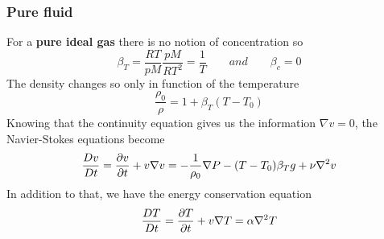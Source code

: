 		\subsubsection{Pure fluid}
			For a \textbf{pure ideal gas} there is no notion of concentration so 
			\begin{equation}
				\beta _T = \frac{RT}{pM} \frac{pM}{RT^2} = \frac{1}{T} \qquad and \qquad \beta _c = 0
			\end{equation}
			The density changes so only in function of the temperature 
			\begin{equation}
				\frac{\rho _0}{\rho} = 1 + \beta _T (T-T_0)
			\end{equation}
			Knowing that the continuity equation gives us the information $\nabla v = 0$, the Navier-Stokes equations become
			\begin{equation}
				\frac{Dv}{Dt} = \frac{\partial v}{\partial t} + v\nabla v = - \frac{1}{\rho _0} \nabla P - (T-T_0) \beta _T g + \nu \nabla ^2 v
				\label{eq:5.62}
			\end{equation}
			In addition to that, we have the energy conservation equation
			\begin{equation}
				\frac{DT}{Dt} = \frac{\partial T}{\partial t} + v \nabla T = \alpha \nabla ^2 T 
			\end{equation}
